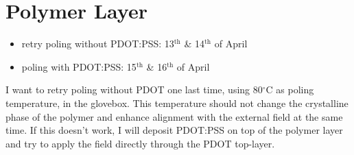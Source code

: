 \documentclass[a4paper,10pt]{article}
\begin{document}
\section*{Polymer Layer}
\begin{itemize}
	\item retry poling without PDOT:PSS: 13$^{\text{th}}$ \& 14$^{\text{th}}$ of April
	\item poling with PDOT:PSS: 15$^{\text{th}}$ \& 16$^{\text{th}}$ of April
\end{itemize}
I want to retry poling without PDOT one last time, using 80$^{\circ}$C as poling temperature, in the glovebox. This temperature should not change the crystalline phase of the polymer and enhance alignment with the external field at the same time. If this doesn\rq{}t work, I will deposit PDOT:PSS on top of the polymer layer and try to apply the field directly through the PDOT top-layer.
\end{document}
